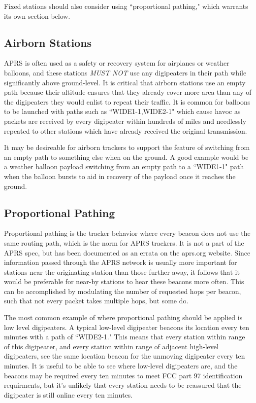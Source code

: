 Fixed stations should also consider using ``proportional pathing,"
which warrants its own section below.

\subsection{Airborn Stations}

APRS is often used as a safety or recovery system for airplanes or weather balloons,
and these stations \emph{MUST NOT} use any digipeaters in their path while
significantly above ground-level. \cite{nopathhigh}
It is critical that airborn stations use an empty path because their
altitude ensures that they already cover more area than any of the digipeaters
they would enlist to repeat their traffic.
It is common for balloons to be launched with paths such as ``WIDE1-1,WIDE2-1"
which cause havoc as packets are received by every digipeater within hundreds of
miles and needlessly repeated to other stations which have already received the
original transmission.

It may be desireable for airborn trackers to support the feature of switching from
an empty path to something else when on the ground.
A good example would be a weather balloon payload switching from an empty path
to a ``WIDE1-1" path when the balloon bursts to aid in recovery of the
payload once it reaches the ground.

\subsection{Proportional Pathing}

Proportional pathing is the tracker behavior where every beacon does not
use the same routing path, which is the norm for APRS trackers.
It is not a part of the APRS spec, but has been documented as an
errata on the aprs.org website. \cite{bobproppath}
Since information passed through the APRS network is usually more important
for stations near the originating station than those further away,
it follows that it would be preferable for near-by stations to hear these beacons
more often.
This can be accomplished by modulating the number of requested hops per beacon,
such that not every packet takes multiple hops, but some do.

The most common example of where proportional pathing should be applied is
low level digipeaters.
A typical low-level digipeater beacons its location every ten minutes with
a path of ``WIDE2-1."
This means that every station within range of this digipeater, 
and every station within range of adjacent high-level digipeaters,
see the same location beacon for the unmoving digipeater every ten minutes.
It is useful to be able to see where low-level digipeaters are,
and the beacons may be required every ten minutes to meet FCC part 97 identification
requirments,
but it's unlikely that every station needs to be reassured that the digipeater
is still online every ten minutes.

